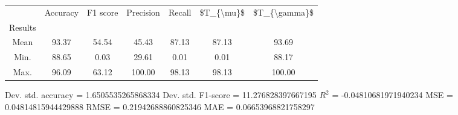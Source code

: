 \begin{tabular}{|c|c|c|c|c|c|c|}
\toprule
{} &  Accuracy &  F1 score &  Precision &  Recall &  \$T\_\{\textbackslash mu\}\$ &  \$T\_\{\textbackslash gamma\}\$ \\
Results &           &           &            &         &            &               \\
\hline
Mean    &     93.37 &     54.54 &      45.43 &   87.13 &      87.13 &         93.69 \\
Min.    &     88.65 &      0.03 &      29.61 &    0.01 &       0.01 &         88.17 \\
Max.    &     96.09 &     63.12 &     100.00 &   98.13 &      98.13 &        100.00 \\
\bottomrule
\end{tabular}

 Dev. std. accuracy = 1.6505535265868334
 Dev. std. F1-score = 11.276828397667195
 $R^2$ = -0.04810681971940234
 MSE = 0.04814815944429888
 RMSE = 0.21942688860825346
 MAE = 0.06653968821758297